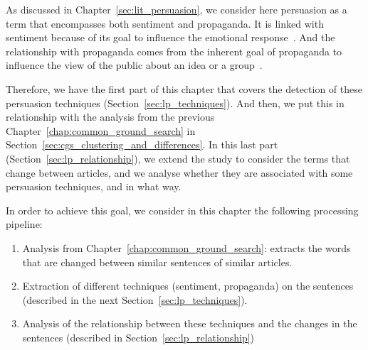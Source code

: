As discussed in Chapter~\ref{sec:lit_persuasion}, we consider here \gls{persuasion} as a term that encompasses both \gls{sentiment} and \gls{propaganda}. %
It is linked with sentiment because of its goal to influence the emotional response~\citep{gatti2014sentiment,rocklage2018persuasion,petty2015emotion,desteno2004discrete}.
And the relationship with propaganda comes from the inherent goal of propaganda to influence the view of the public about an idea or a group~\citep{bernays,jowett2018propaganda}.



Therefore, we have the first part of this chapter that covers the detection of these persuasion techniques (Section~\ref{sec:lp_techniques}).
And then, we put this in relationship with the analysis from the previous Chapter~\ref{chap:common_ground_search} in Section~\ref{sec:cgs_clustering_and_differences}.
In this last part (Section~\ref{sec:lp_relationship}), 
we extend the study to consider the terms that change between articles, and we analyse whether they are associated with some persuasion techniques, and in what way. %

In order to achieve this goal, we consider in this chapter the following processing pipeline:
\begin{enumerate}
    \item Analysis from Chapter~\ref{chap:common_ground_search}: extracts the words that are changed between similar sentences of similar articles.
    \item Extraction of different techniques (sentiment, propaganda) on the sentences (described in the next Section~\ref{sec:lp_techniques}). %
    \item Analysis of the relationship between these techniques and the changes in the sentences (described in Section~\ref{sec:lp_relationship})
\end{enumerate}



